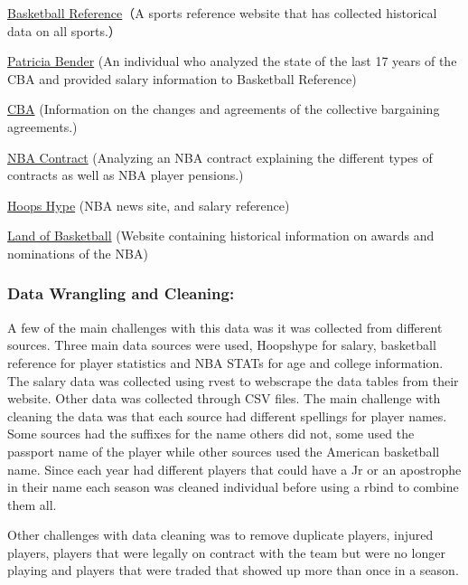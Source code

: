 \documentclass[]{article}
\begin{document}
\href{https://www.basketball-reference.com}{Basketball Reference}（A
sports reference website that has collected historical data on all
sports.）

\href{https://www.eskimo.com/~pbender/}{Patricia Bender} (An individual
who analyzed the state of the last 17 years of the CBA and provided
salary information to Basketball Reference)

\href{http://www.cbafaq.com/salarycap.htm}{CBA} (Information on the
changes and agreements of the collective bargaining agreements.)

\href{https://atlhawksfanatic.github.io/NBA-CBA/uniform-player-contract.html\#bonuses}{NBA
Contract} (Analyzing an NBA contract explaining the different types of
contracts as well as NBA player pensions.)

\href{https://hoopshype.com}{Hoops Hype} (NBA news site, and salary
reference)

\href{https://www.landofbasketball.com}{Land of Basketball} (Website
containing historical information on awards and nominations of the NBA)

\subsubsection{\texorpdfstring{\textbf{Data Wrangling and
Cleaning:}}{Data Wrangling and Cleaning:}}\label{data-wrangling-and-cleaning}

A few of the main challenges with this data was it was collected from
different sources. Three main data sources were used, Hoopshype for
salary, basketball reference for player statistics and NBA STATs for age
and college information. The salary data was collected using rvest to
webscrape the data tables from their website. Other data was collected
through CSV files. The main challenge with cleaning the data was that
each source had different spellings for player names. Some sources had
the suffixes for the name others did not, some used the passport name of
the player while other sources used the American basketball name. Since
each year had different players that could have a Jr or an apostrophe in
their name each season was cleaned individual before using a rbind to
combine them all.

Other challenges with data cleaning was to remove duplicate players,
injured players, players that were legally on contract with the team but
were no longer playing and players that were traded that showed up more
than once in a season.
\end{document}
